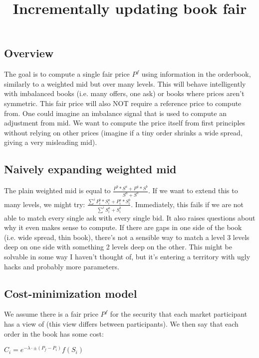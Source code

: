 \documentclass[]{article}
\title{Incrementally updating book fair}
\author{}
\begin{document}
	
	\maketitle
	
	\subsection{Overview}
	
	The goal is to compute a single fair price $P^f$ using information in the orderbook, similarly to a weighted mid but over many levels. This will behave intelligently with imbalanced books (i.e. many offers, one ask) or books where prices aren't symmetric. This fair price will also NOT require a reference price to compute from. One could imagine an imbalance signal that is used to compute an adjustment from mid. We want to compute the price itself from first principles without relying on other prices (imagine if a tiny order shrinks a wide spread, giving a very misleading mid).
	
	
	\subsection{Naively expanding weighted mid}
	
	The plain weighted mid is equal to $\frac{P^b * S^a + P^a * S^b}{S^a + S^b}$. If we want to extend this to many levels, we might try: $\frac{\sum^i P^b_i * S^a_i + P^a_i * S^b_i}{\sum^i S^a_i + S^b_i}$. Immediately, this fails if we are not able to match every single ask with every single bid.
	It also raises questions about why it even makes sense to compute. If there are gaps in one side of the book (i.e. wide spread, thin book), there's not a sensible way to match a level 3 levels deep on one side with something 2 levels deep on the other. This might be solvable in some way I haven't thought of, but it's entering a territory with ugly hacks and probably more parameters.
	
	\subsection{Cost-minimization model}
	
	We assume there is a fair price $P^f$ for the security that each market participant has a view of (this view differs between participants). We then say that each order in the book has some cost:
	
	\begin{math}
		C_i = e^{-\lambda \cdot \pm (P_f - P_i )} f(S_i)
	\end{math}
	
\end{document}
